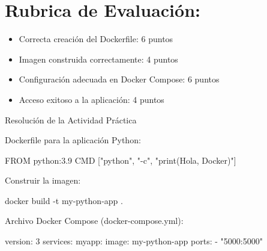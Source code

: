 \documentclass[
  a4paper,
  DIV=11,
  numbers=noendperiod,
  onepage,
  openany]{scrreprt}
\newenvironment{Shaded}{\begin{snugshade}}{\end{snugshade}}
\newcommand{\AttributeTok}[1]{\textcolor[rgb]{0.40,0.45,0.13}{#1}}
\newcommand{\ExtensionTok}[1]{\textcolor[rgb]{0.00,0.23,0.31}{#1}}
\newcommand{\FunctionTok}[1]{\textcolor[rgb]{0.28,0.35,0.67}{#1}}
\newcommand{\KeywordTok}[1]{\textcolor[rgb]{0.00,0.23,0.31}{#1}}
\newcommand{\NormalTok}[1]{\textcolor[rgb]{0.00,0.23,0.31}{#1}}
\newcommand{\StringTok}[1]{\textcolor[rgb]{0.13,0.47,0.30}{#1}}
\providecommand{\tightlist}{%
  \setlength{\itemsep}{0pt}\setlength{\parskip}{0pt}}\usepackage{longtable,booktabs,array}
\begin{document}
\hypertarget{rubrica-de-evaluaciuxf3n-2}{%
\section{Rubrica de Evaluación:}\label{rubrica-de-evaluaciuxf3n-2}}

\begin{itemize}
\tightlist
\item
  Correcta creación del Dockerfile: 6 puntos
\item
  Imagen construida correctamente: 4 puntos
\item
  Configuración adecuada en Docker Compose: 6 puntos
\item
  Acceso exitoso a la aplicación: 4 puntos
\end{itemize}

Resolución de la Actividad Práctica

Dockerfile para la aplicación Python:

\begin{Shaded}
\begin{Highlighting}[]
\KeywordTok{FROM}\NormalTok{ python:3.9}
\KeywordTok{CMD}\NormalTok{ [}\StringTok{"python"}\NormalTok{, }\StringTok{"{-}c"}\NormalTok{, }\StringTok{"print(\textquotesingle{}Hola, Docker\textquotesingle{})"}\NormalTok{]}
\end{Highlighting}
\end{Shaded}

Construir la imagen:

\begin{Shaded}
\begin{Highlighting}[]
\ExtensionTok{docker}\NormalTok{ build }\AttributeTok{{-}t}\NormalTok{ my{-}python{-}app .}
\end{Highlighting}
\end{Shaded}

Archivo Docker Compose (docker-compose.yml):

\begin{Shaded}
\begin{Highlighting}[]
\FunctionTok{version}\KeywordTok{:}\AttributeTok{ }\StringTok{\textquotesingle{}3\textquotesingle{}}
\FunctionTok{services}\KeywordTok{:}
\AttributeTok{  }\FunctionTok{myapp}\KeywordTok{:}
\AttributeTok{    }\FunctionTok{image}\KeywordTok{:}\AttributeTok{ my{-}python{-}app}
\AttributeTok{    }\FunctionTok{ports}\KeywordTok{:}
\AttributeTok{      }\KeywordTok{{-}}\AttributeTok{ }\StringTok{"5000:5000"}
\end{Highlighting}
\end{Shaded}
\end{document}
